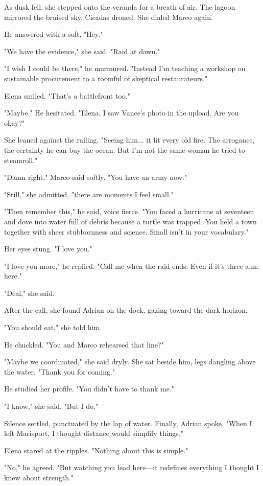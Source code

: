 As dusk fell, she stepped onto the veranda for a breath of air. The lagoon mirrored the bruised sky. Cicadas droned. She dialed Marco again.

He answered with a soft, "Hey."

"We have the evidence," she said. "Raid at dawn."

"I wish I could be there," he murmured. "Instead I'm teaching a workshop on sustainable procurement to a roomful of skeptical restaurateurs."

Elena smiled. "That's a battlefront too."

"Maybe." He hesitated. "Elena, I saw Vance's photo in the upload. Are you okay?"

She leaned against the railing. "Seeing him... it lit every old fire. The arrogance, the certainty he can buy the ocean. But I'm not the same woman he tried to steamroll."

"Damn right," Marco said softly. "You have an army now."

"Still," she admitted, "there are moments I feel small."

"Then remember this," he said, voice fierce. "You faced a hurricane at seventeen and dove into water full of debris because a turtle was trapped. You held a town together with sheer stubbornness and science. Small isn't in your vocabulary."

Her eyes stung. "I love you."

"I love you more," he replied. "Call me when the raid ends. Even if it's three a.m. here."

"Deal," she said.

After the call, she found Adrian on the dock, gazing toward the dark horizon.

"You should eat," she told him.

He chuckled. "You and Marco rehearsed that line?"

"Maybe we coordinated," she said dryly. She sat beside him, legs dangling above the water. "Thank you for coming."

He studied her profile. "You didn't have to thank me."

"I know," she said. "But I do."

Silence settled, punctuated by the lap of water. Finally, Adrian spoke. "When I left Marisport, I thought distance would simplify things."

Elena stared at the ripples. "Nothing about this is simple."

"No," he agreed. "But watching you lead here—it redefines everything I thought I knew about strength."

